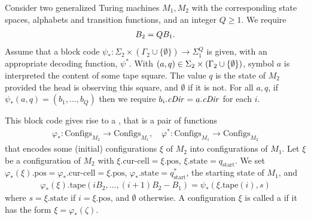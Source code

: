 \documentclass[12pt]{memoir}
\renewcommand{\ge}{\geq}
\newcommand{\fld}[1]{\ensuremath{\textit{#1\/}}}
\def\B{B}
\newcommand{\Configs}{\mathrm{Configs}}
\newcommand{\pos}{\mathrm{pos}}
\newcommand{\curcell}{\textrm{cur-cell}}
\newcommand{\Q}{Q}
\newcommand{\cDir}{\fld{cDir}}
\newcommand{\start}{\mathrm{start}}
\newcommand{\state}{\mathrm{state}}
\newcommand{\tape}{\mathrm{tape}}
\begin{document}
\begin{definition}\label{def:configuration-code}
\begin{sloppypar}
 Consider two generalized Turing machines \( M_{1},M_{2} \) with the corresponding
state spaces, alphabets and transition functions, and an integer \( \Q\ge 1 \).
We require
\begin{align}\label{eq:B_{2}-B_{1}-\Q}
  \B_{2} = \Q \B_{1}.
\end{align}
Assume that a block code
\(
   \psi_{*}:\Sigma_{2}\times(\Gamma_{2}\cup\{\emptyset\})\to\Sigma_{1}^{\Q}
\)
is given, with an appropriate decoding function, \( \psi^{*} \).
With \( (a,q)\in\Sigma_{2}\times(\Gamma_{2}\cup\{\emptyset\}) \),
symbol \( a \) is interpreted the content of some tape square.
The value \( q \) is the state of \( M_{2} \) provided the head is observing this square,
and \( \emptyset \) if it is not.
For all \( a,q \), if \( \psi_{*}(a,q) = (b_{1},\dots,b_{\Q}) \) then we require
\( b_{i}.\cDir=a.\cDir \) for each \( i \).
\end{sloppypar}

This block code gives rise to a , that is a pair of functions
    \begin{align*}
        \varphi_{*} :\Configs_{M_{2}} \to \Configs_{M_{1}},
        \quad
        \varphi^{*}:\Configs_{M_{1}} \to \Configs_{M_{2}}
    \end{align*}
    that encodes some (initial) configurations \( \xi \) of \( M_{2} \) into configurations of \( M_{1} \).
Let \( \xi \) be a configuration of \( M_{2} \) with \( \xi.\curcell=\xi.\pos \), \( \xi.\state = q_{\start} \).
We set \( \varphi_{*}(\xi).\pos = \varphi_{*}.\curcell= \xi.\pos \), \(\varphi_{*}.\state=q^{*}_{\start}  \),
the starting state of \( M_{1} \), and
\begin{align*}
 \varphi_{*}(\xi).\tape(i\B_{2}, \dots, (i+1)\B_{2} - \B_{1}) = \psi_{*}(\xi.\tape(i), s)
 \end{align*}
where \( s=\xi.\state \) if \( i = \xi.\pos \), and \( \emptyset \) otherwise.
A configuration \( \xi \) is called a  if 
it has the form \( \xi=\varphi_{*}(\zeta) \).
 \end{definition}
\end{document}
